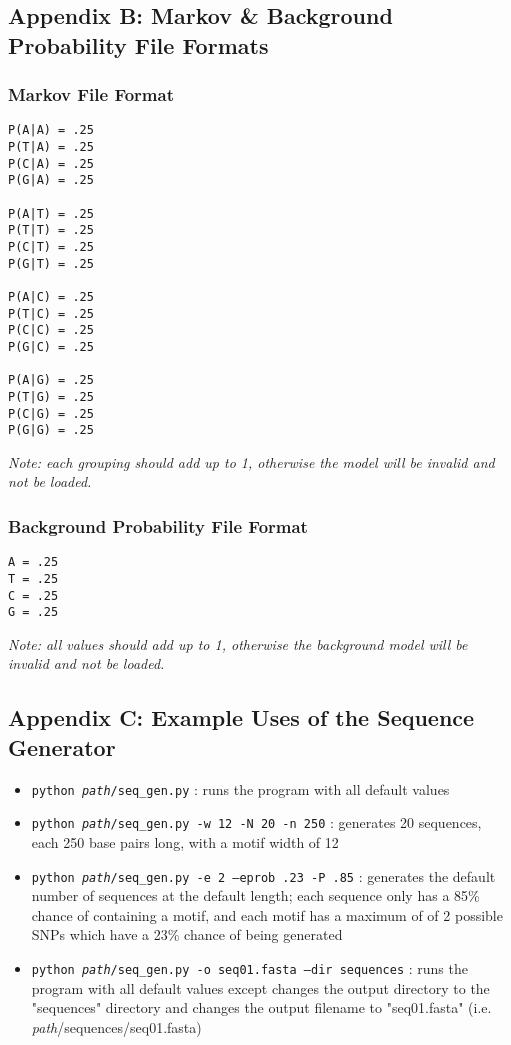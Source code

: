 \documentclass[12pt]{article}
\begin{document}
\subsection*{Appendix B: Markov \& Background Probability File Formats}

\subsubsection*{Markov File Format}
\begin{verbatim}
P(A|A) = .25
P(T|A) = .25
P(C|A) = .25
P(G|A) = .25

P(A|T) = .25
P(T|T) = .25
P(C|T) = .25
P(G|T) = .25

P(A|C) = .25
P(T|C) = .25
P(C|C) = .25
P(G|C) = .25

P(A|G) = .25
P(T|G) = .25
P(C|G) = .25
P(G|G) = .25
\end{verbatim}

\textit{Note: each grouping should add up to 1, otherwise the model will be invalid and not be loaded.}


\subsubsection*{Background Probability File Format}
\begin{verbatim}
A = .25
T = .25
C = .25
G = .25
\end{verbatim}

\textit{Note: all values should add up to 1, otherwise the background model will be invalid and not be loaded.}

\subsection*{Appendix C: Example Uses of the Sequence Generator}

\begin{itemize}
	\item \texttt{python \textit{path}/seq\_gen.py} : runs the program with all default values
	\item \texttt{python \textit{path}/seq\_gen.py -w 12 -N 20 -n 250} : generates 20 sequences, each 250 base pairs long, with a motif width of 12
	\item \texttt{python \textit{path}/seq\_gen.py -e 2 --eprob .23 -P .85} : generates the default number of sequences at the default length; each sequence only has a 85\% chance of containing a motif, and each motif has a maximum of of 2 possible SNPs which have a 23\% chance of being generated
	\item \texttt{python \textit{path}/seq\_gen.py -o seq01.fasta --dir sequences} : runs the program with all default values except changes the output directory to the "sequences" directory and changes the output filename to "seq01.fasta" (i.e. \textit{path}/sequences/seq01.fasta)
\end{itemize}
\end{document}
